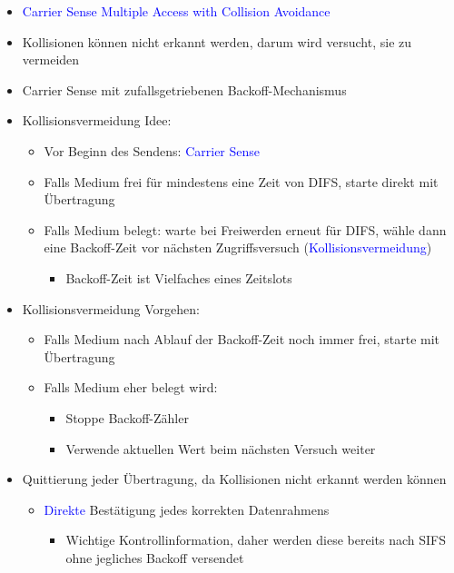 \begin{itemize}
    \item \textcolor{blue}{Carrier Sense Multiple Access with Collision Avoidance}
    \item Kollisionen können nicht erkannt werden, darum wird versucht, sie zu vermeiden
    \item Carrier Sense mit zufallsgetriebenen Backoff-Mechanismus
    \item Kollisionsvermeidung Idee:
    \begin{itemize}
        \item Vor Beginn des Sendens: \textcolor{blue}{Carrier Sense}
        \item Falls Medium frei für mindestens eine Zeit von DIFS, starte direkt mit Übertragung
        \item Falls Medium belegt: warte bei Freiwerden erneut für DIFS, wähle dann eine Backoff-Zeit vor nächsten Zugriffsversuch (\textcolor{blue}{Kollisionsvermeidung})
        \begin{itemize}
            \item Backoff-Zeit ist Vielfaches eines Zeitslots
        \end{itemize}
    \end{itemize}
    \item Kollisionsvermeidung Vorgehen:
    \begin{itemize}
        \item Falls Medium nach Ablauf der Backoff-Zeit noch immer frei,
        starte mit Übertragung
        \item Falls Medium eher belegt wird:
        \begin{itemize}
            \item Stoppe Backoff-Zähler
            \item Verwende aktuellen Wert beim nächsten Versuch weiter
        \end{itemize}
    \end{itemize}
    \item Quittierung jeder Übertragung, da Kollisionen nicht erkannt werden können
    \begin{itemize}
        \item \textcolor{blue}{Direkte} Bestätigung jedes korrekten Datenrahmens
        \begin{itemize}
            \item Wichtige Kontrollinformation, daher werden diese bereits nach SIFS ohne jegliches Backoff versendet
        \end{itemize}
    \end{itemize}
\end{itemize}